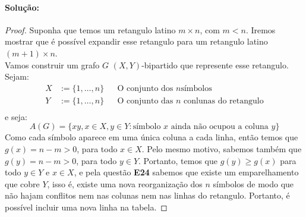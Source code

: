 \documentclass[11pt,a4paper,notitlepage]{exam}
\begin{document}
\paragraph*{Solução: }
\begin{proof}
    Suponha que temos um retangulo latino $m\times n$, com $m < n$.
    Iremos mostrar que é possível expandir esse retangulo para um
    retangulo latino $(m+1)\times n$.\\
    Vamos construir um grafo $G$ $(X,Y)$-bipartido que
    represente esse retangulo. Sejam:
    \begin{align*}
        X &:= \{1, \dots, n\} && \text{O conjunto dos $n$
        símbolos}\\
        Y &:= \{1, \dots, n\} && \text{O conjunto das $n$ conlunas do
        retangulo}\\ 
    \end{align*}
    e seja:
    $$
    A(G) = \{xy, x \in X, y \in Y: \text{símbolo $x$ ainda não
        ocupou a coluna $y$}\}
    $$
    Como cada símbolo aparece em uma única coluna a cada linha, então
    temos que $g(x) = n-m > 0$, para todo $x\in X$. Pelo mesmo motivo,
    sabemos também que $g(y) = n-m > 0$, para todo $y \in Y$. Portanto,
    temos que $g(y) \geq g(x)$
    para todo $y\in Y$ e $x\in X$, e pela questão \textbf{E24} sabemos
    que existe um emparelhamento que cobre $Y$, isso é, existe uma nova
    reorganização dos $n$ símbolos de modo que não hajam
    conflitos nem nas colunas nem nas linhas do retangulo.
    Portanto, é possível incluir uma nova linha na tabela.
\end{proof}
\end{document}
